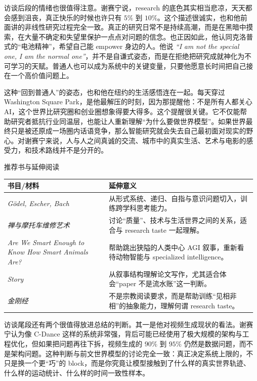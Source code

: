 \documentclass[a4paper,12pt]{article}
\begin{document}
访谈后段的情绪也很值得注意。谢赛宁说，research 的底色其实相当悲凉，天天都会感到沮丧，真正快乐的时候也许只有 \(5\%\) 到 \(10\%\)。这个描述很诚实，也和他前面讲的非线性研究过程完全一致。真正的研究日常不是持续高潮，而是在黑暗中摸索，在大量不确定和失望里保护一点点对问题的信念。也正因如此，他认同克洛普式的“电池精神”，希望自己能 empower 身边的人。他说 \textit{``I am not the special one, I am the normal one''}，并不是自谦式姿态，而是在拒绝把研究成就神化为不可学习的天赋。普通人也可以成为系统中的关键变量，只要他愿意长时间把自己接在一个高价值问题上。

这种“回到普通人”的姿态，也和他在纽约的生活感悟连在一起。每天穿过 Washington Square Park，是他最解压的时刻，因为那提醒他：不是所有人都关心 AI，这个世界比研究圈和创业圈想象得要大得多。这个提醒很关键。它不仅能帮助研究者抵抗行业同温层，也能让人重新理解“为什么要做世界模型”。如果世界最终只是被还原成一场圈内话语竞争，那么智能研究就会失去自己最初面对现实的野心。对谢赛宁来说，人与人之间真诚的交流、城市中的真实生活、艺术与电影的感受力，和技术路线并不是分开的。

\begin{knowledgebox}{推荐书与延伸阅读}
\begin{tabularx}{\textwidth}{>{\raggedright\arraybackslash}p{} Y}
\toprule
书目/材料 & 延伸意义 \\
\midrule
\textit{Gödel, Escher, Bach} & 从形式系统、递归、自指与意识问题切入，训练跨学科思考能力。 \\
\textit{禅与摩托车维修艺术} & 讨论“质量”、技术与生活世界之间的关系，适合与 research taste 一起理解。 \\
\textit{Are We Smart Enough to Know How Smart Animals Are?} & 帮助跳出狭隘的人类中心 AGI 叙事，重新看待动物智能与 specialized intelligence。 \\
\textit{Story} & 从叙事结构理解论文写作，尤其适合体会“paper 不是流水账”这一判断。 \\
\textit{金刚经} & 不是宗教阅读要求，而是帮助训练“见相非相”的抽象能力，理解何谓 research taste。 \\
\bottomrule
\end{tabularx}
\end{knowledgebox}

访谈尾段还有两个很值得放进总结的判断。其一是他对视频生成现状的看法。谢赛宁认为像 C-Dance 这样的系统非常强，背后可能已经使用了极大规模的架构与工程优化，但如果把问题再往下拆，视频生成的 \(90\%\) 到 \(95\%\) 仍然是数据问题，而不是架构问题。这种判断与前文世界模型的讨论完全一致：真正决定系统上限的，不只是换一个更“巧”的 block，而是你究竟让模型接触到了什么样的真实世界轨迹、什么样的运动统计、什么样的时间一致性样本。
\end{document}
